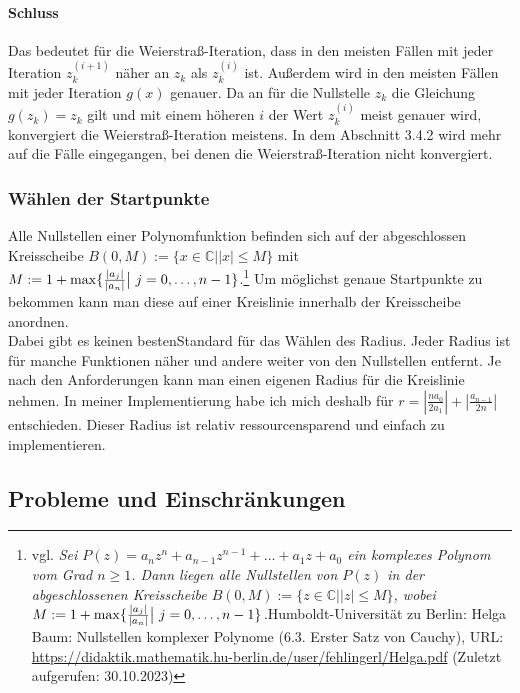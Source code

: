 \documentclass[12pt]{article}
\begin{document}
\paragraph{Schluss}
Das bedeutet für die Weierstraß-Iteration, dass in den meisten Fällen mit jeder Iteration $z_k^{(i+1)}$ näher an $z_k$ als $z_k^{(i)}$ ist. Außerdem wird in den meisten Fällen mit jeder Iteration $g(x)$ genauer. Da an für die Nullstelle $z_k$ die Gleichung $g(z_k) = z_k$ gilt und mit einem höheren $i$ der Wert $z_k^{(i)}$ meist genauer wird, konvergiert die Weierstraß-Iteration meistens. In dem Abschnitt 3.4.2 wird mehr auf die Fälle eingegangen, bei denen die Weierstraß-Iteration nicht konvergiert.

\subsubsection{Wählen der Startpunkte}
Alle Nullstellen einer Polynomfunktion befinden sich auf der abgeschlossen Kreisscheibe  $B(0,M) := \{x \in \mathbb{C} \bigr| |x| \le M\}$ mit $M := 1 + \max\{\frac{|a_j|}{|a_n|}\bigr|\text{\space}j=0,\dots,n-1\}$.\footnote{vgl. \glqq\textit{Sei $P(z) = a_nz^n+a_{n-1}z^{n-1}+\dots+a_1z+a_0$ ein komplexes Polynom vom Grad $n \ge 1$. Dann liegen alle Nullstellen von $P(z)$ in der abgeschlossenen Kreisscheibe $B(0,M) := \{z \in \mathbb{C} \bigr| |z| \le M\}$, wobei $M := 1 + \max\{\frac{|a_j|}{|a_n|}\bigr|\text{\space}j=0,\dots,n-1\}$.}\grqq\space Humboldt-Universität zu Berlin: Helga Baum: Nullstellen komplexer Polynome (6.3. Erster Satz von Cauchy), URL: \url{https://didaktik.mathematik.hu-berlin.de/user/fehlingerl/Helga.pdf} (Zuletzt aufgerufen: 30.10.2023)}  Um möglichst genaue Startpunkte zu bekommen kann man diese auf einer Kreislinie innerhalb der Kreisscheibe anordnen. \\
Dabei gibt es keinen \glqq besten\grqq\space Standard für das Wählen des Radius. Jeder Radius ist für manche Funktionen näher und andere weiter von den Nullstellen entfernt. Je nach den Anforderungen kann man einen eigenen Radius für die Kreislinie nehmen. In meiner Implementierung habe ich mich deshalb für $r = |\frac{na_0}{2a_1}| + |\frac{a_{n-1}}{2n}|$ entschieden.
Dieser Radius ist relativ ressourcensparend und einfach zu implementieren.

\subsection{Probleme und Einschränkungen}
\end{document}
